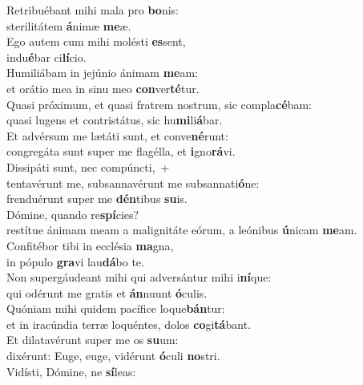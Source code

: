 \evenverse Retribuébant mihi mala pro \textbf{bo}nis:~\*\\
\evenverse sterilitátem \textbf{á}nimæ \textbf{me}æ.\\
\oddverse Ego autem cum mihi molésti \textbf{es}sent,~\*\\
\oddverse indu\textbf{é}bar ci\textbf{lí}cio.\\
\evenverse Humiliábam in jejúnio ánimam \textbf{me}am:~\*\\
\evenverse et orátio mea in sinu meo \textbf{con}ver\textbf{té}tur.\\
\oddverse Quasi próximum, et quasi fratrem nostrum, sic compla\textbf{cé}bam:~\*\\
\oddverse quasi lugens et contristátus, sic hu\textbf{mi}li\textbf{á}bar.\\
\evenverse Et advérsum me lætáti sunt, et conve\textbf{né}runt:~\*\\
\evenverse congregáta sunt super me flagélla, et \textbf{i}gno\textbf{rá}vi.\\
\oddverse Dissipáti sunt, nec compúncti,~+\\
\oddverse  tentavérunt me, subsannavérunt me subsannati\textbf{ó}ne:~\*\\
\oddverse frenduérunt super me \textbf{dén}tibus \textbf{su}is.\\
\evenverse Dómine, quando re\textbf{spí}cies?~\*\\
\evenverse restítue ánimam meam a malignitáte eórum, a leónibus \textbf{ú}nicam \textbf{me}am.\\
\oddverse Confitébor tibi in ecclésia \textbf{ma}gna,~\*\\
\oddverse in pópulo \textbf{gra}vi lau\textbf{dá}bo te.\\
\evenverse Non supergáudeant mihi qui adversántur mihi i\textbf{ní}que:~\*\\
\evenverse qui odérunt me gratis et \textbf{án}nuunt \textbf{ó}culis.\\
\oddverse Quóniam mihi quidem pacífice loque\textbf{bán}tur:~\*\\
\oddverse et in iracúndia terræ loquéntes, dolos \textbf{co}gi\textbf{tá}bant.\\
\evenverse Et dilatavérunt super me os \textbf{su}um:~\*\\
\evenverse dixérunt: Euge, euge, vidérunt \textbf{ó}culi \textbf{no}stri.\\
\oddverse Vidísti, Dómine, ne \textbf{sí}leas:~\*\\

